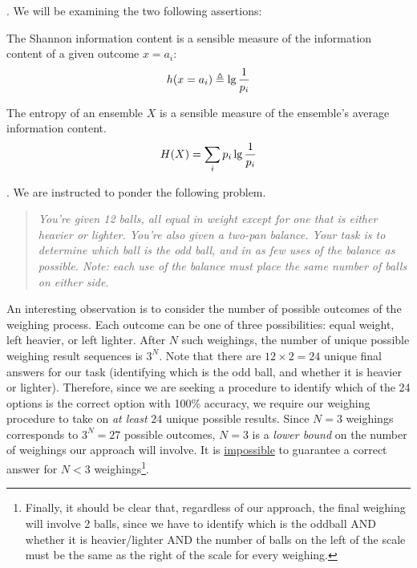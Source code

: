\documentclass[11pt]{article}
\begin{document}

\p {}. We will be examining the two following assertions:
\begin{compactenum}
	\item The Shannon information content is a sensible measure of the information content of a given outcome $x = a_i$:
	\begin{align}
		h(x = a_i) \triangleq \lg\frac{1}{p_i} \label{shannon-info-content}
	\end{align}
	
	\item The entropy of an ensemble $X$ is a sensible measure of the ensemble's average information content. 
	\begin{align}
		H(X) = \sum_i p_i \lg\frac{1}{p_i}
	\end{align}
\end{compactenum}

\myspace
\p {}. We are instructed to ponder the following problem. 
\vspace{-1em}
\begin{quote}
	{\itshape\footnotesize You're given 12 balls, all equal in weight except for one that is either heavier or lighter. You're also given a two-pan balance. Your task is to determine which ball is the odd ball, and in as few uses of the balance as possible. Note: each use of the balance must place the same number of balls on either side.}
\end{quote}
An interesting observation is to consider the number of possible outcomes of the weighing process. Each outcome can be one of three possibilities: equal weight, left heavier, or left lighter. After $N$ such weighings, the number of unique possible weighing result sequences is $3^N$. Note that there are $12 \times 2 = 24$ unique final answers for our task (identifying which is the odd ball, and whether it is heavier or lighter). Therefore, since we are seeking a procedure to identify which of the 24 options is the correct option with 100\% accuracy, we require our weighing procedure to take on \textit{at least} $24$ unique possible results. Since $N=3$ weighings corresponds to $3^N = 27$ possible outcomes, $N=3$ is a \textit{lower bound} on the number of weighings our approach will involve. It is \underline{impossible} to guarantee a correct answer for $N < 3$ weighings\footnote{Finally, it should be clear that, regardless of our approach, the final weighing will involve 2 balls, since we have to identify which is the oddball AND whether it is heavier/lighter AND the number of balls on the left of the scale must be the same as the right of the scale for every weighing.}. \\
\end{document}

